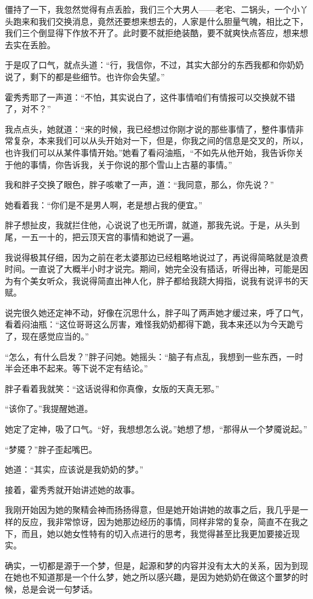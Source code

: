 僵持了一下，我忽然觉得有点丢脸，我们三个大男人——老宅、二锅头，一个小丫头跑来和我们交换消息，竟然还要想来想去的，人家是什么胆量气魄，相比之下，我们三个倒显得下作放不开了。此时要不就拒绝装酷，要不就爽快点答应，想来想去实在丢脸。

于是叹了口气，就点头道：“行，我信你，不过，其实大部分的东西我都和你奶奶说了，剩下的都是些细节。也许你会失望。”

霍秀秀耶了一声道：“不怕，其实说白了，这件事情咱们有情报可以交换就不错了，对不？”

我点点头，她就道：“来的时候，我已经想过你刚才说的那些事情了，整件事情非常复杂，本来我们可以从头开始对一下，但是，你我之间的信息是交叉的，所以，也许我们可以从某件事情开始。”她看了看闷油瓶，“不如先从他开始，我告诉你关于他的事情，你告诉我，关于你说的那个雪山上古墓的事情。”

我和胖子交换了眼色，胖子咳嗽了一声，道：“我同意，那么，你先说？”

她看着我：“你们是不是男人啊，老是想占我的便宜。”

胖子想扯皮，我就拦住他，心说说了也无所谓，就道，那我先说。于是，从头到尾，一五一十的，把云顶天宫的事情和她说了一遍。

我说得极其仔细，因为之前在老太婆那边已经粗略地说过了，再说得简略就是浪费时间。一直说了大概半小时才说完。期间，她完全没有插话，听得出神，可能是因为有个美女听众，我说得简直出神人化，胖子都给我跷大拇指，说我有说评书的天赋。

说完很久她还定神不动，好像在沉思什么，胖子叫了两声她才缓过来，呼了口气，看着闷油瓶：“这位哥哥这么厉害，难怪我奶奶都得下跪，我本来还以为今天跪亏了，现在感觉应当的。”

“怎么，有什么启发？”胖子问她。她摇头：“脑子有点乱，我想到一些东西，一时半会还串不起来。等下说不定有结论。”

胖子看着我就笑：“这话说得和你真像，女版的天真无邪。”

“该你了。”我提醒她道。

她定了定神，吸了口气。“好，我想想怎么说。”她想了想，“那得从一个梦魇说起。”

“梦魇？”胖子歪起嘴巴。

她道：“其实，应该说是我奶奶的梦。”

接着，霍秀秀就开始讲述她的故事。

我刚开始因为她的聚精会神而扬扬得意，但是她开始讲她的故事之后，我几乎是一样的反应，我非常惊讶，因为她那边经历的事情，同样非常的复杂，简直不在我之下，而且，她以她女性特有的切入点进行的思考，我觉得甚至比我更加要接近现实。

确实，一切都是源于一个梦，但是，起源和梦的内容并没有太大的关系，因为到现在她也不知道那是一个什么梦，她之所以感兴趣，是因为她奶奶在做这个噩梦的时候，总是会说一句梦话。


